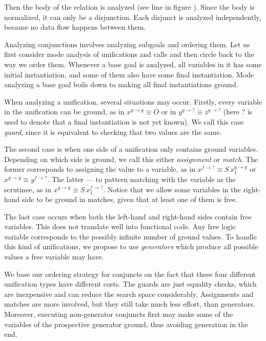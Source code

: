 Then the body of the relation is analyzed (see line  in figure ).
Since the body is normalized, it can only be a disjunction.
Each disjunct is analyzed independently, because no data flow happens between them.

Analyzing conjunctions involves analyzing subgoals and ordering them.
Let us first consider mode analysis of unifications and calls and then circle back to the way we order them.
Whenever a base goal is analyzed, all variables in it has some initial instantiation, and some of them also have some final instantiation.
Mode analyzing a base goal boils down to making all final instantiations ground.

When analyzing a unification, several situations may occur.
Firstly, every variable in the unification can be ground, as in $x^{g \rightarrow g} \equiv O$ or in $y^{g \rightarrow ?} \equiv z^{g \rightarrow ?}$ (here $?$ is used to denote that a final instantiation is not yet known).
We call this case \emph{guard}, since it is equivalent to checking that two values are the same.

The second case is when one side of a unification only contains ground variables.
Depending on which side is ground, we call this either \emph{assignment} or \emph{match}.
The former corresponds to assigning the value to a variable, as in $x^{f \rightarrow ?} \equiv S \, x_1^{g \rightarrow g}$ or $x^{g \rightarrow g} \equiv y^{f \rightarrow ?}$.
The latter --- to pattern matching with the variable as the scrutinee, as in $x^{g \rightarrow g} \equiv S \, x_1^{f \rightarrow ?}$.
Notice that we allow some variables in the right-hand side to be ground in matches, given that at least one of them is free.

The last case occurs when both the left-hand and right-hand sides contain free variables.
This does not translate well into functional code.
Any free logic variable corresponds to the possibly infinite number of ground values.
To handle this kind of unifications, we propose to use \emph{generators} which produce all possible values a free variable may have.

We base our ordering strategy for conjuncts on the fact that these four different unification types have different costs.
The guards are just equality checks, which are inexpensive and can reduce the search space considerably.
Assignments and matches are more involved, but they still take much less effort, than generators.
Moreover, executing non-generator conjuncts first may make some of the variables of the prospective generator ground, thus avoiding generation in the end.

